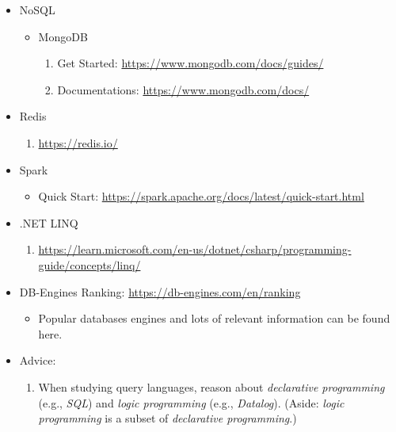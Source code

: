 \documentclass{article}
\begin{document}
\begin{enumerate}
\begin{itemize}
        \item NoSQL
        \begin{itemize}
            \item MongoDB
            \begin{enumerate}
                \item Get Started:
                \href{https://www.mongodb.com/docs/guides/}{https://www.mongodb.com/docs/guides/}
                \item Documentations:
                \href{https://www.mongodb.com/docs/}{https://www.mongodb.com/docs/}
            \end{enumerate}
        \end{itemize}
        \item Redis
        \begin{enumerate}
            \item \href{https://redis.io/}{https://redis.io/}
        \end{enumerate}
        \item Spark
        \begin{itemize}
            \item Quick Start:
            \href{https://spark.apache.org/docs/latest/quick-start.html}{https://spark.apache.org/docs/latest/quick-start.html}
        \end{itemize}
        \item .NET LINQ
            \begin{enumerate}
                \item \href{https://learn.microsoft.com/en-us/dotnet/csharp/programming-guide/concepts/linq/}{https://learn.microsoft.com/en-us/dotnet/csharp/programming-guide/concepts/linq/}
            \end{enumerate}
        \item DB-Engines Ranking:
            \href{https://db-engines.com/en/ranking}{https://db-engines.com/en/ranking}
            \begin{itemize}
                \item Popular databases engines and lots of relevant information can be found here.
            \end{itemize}        
        \item Advice:
        \begin{enumerate}
            \item When studying query languages, reason about \emph{declarative programming} (e.g., \emph{SQL}) and \emph{logic programming} (e.g., \emph{Datalog}).
            (Aside: \emph{logic programming} is a subset of \emph{declarative programming}.)
        \end{enumerate}
    \end{itemize}


\end{enumerate}
\end{document}
